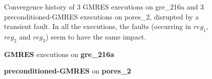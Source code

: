 \documentclass[twoside]{article}
\newcounter{fig}\setcounter{fig}{0}
\begin{document}
\begin{figure}[H]
\begin{minipage}[b]{0.48\linewidth}
      
    \end{minipage}
    \caption{Convergence history of 3 GMRES executions on gre_216a and 3 preconditioned-GMRES executions on pores_2, disrupted by a transient fault. In all the executions, the faults (occurring in $reg_1$, $reg_2$ and $reg_3$) seem to have the same impact.}\label{fig:conv_hist_register}
  \end{figure}







  \begin{figure}[H]
    \centering
    
    \begin{minipage}[b]{0.45\linewidth}
      \centering
      \textbf{GMRES} executions on \textbf{gre_216a} 
    \end{minipage}
    \quad
    \begin{minipage}{0.45\linewidth}
      \centering
      \textbf{preconditioned-GMRES} on \textbf{pores_2}
    \end{minipage}\\



\end{figure}
\end{document}
